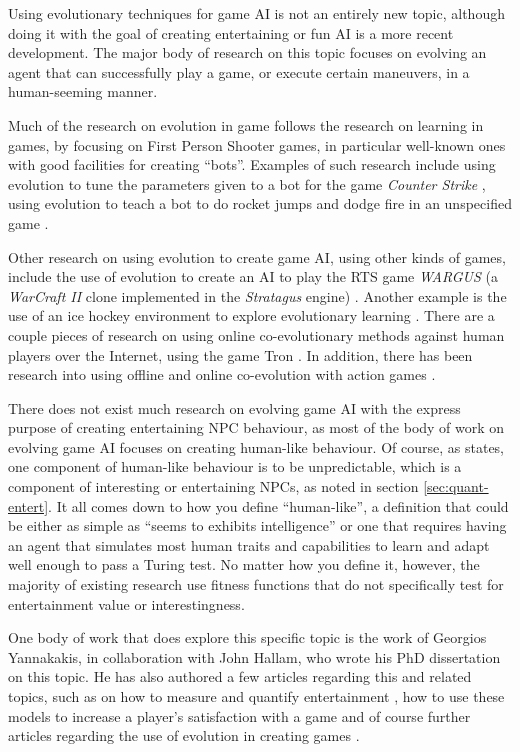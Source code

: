 \documentclass[]{report}
\begin{document}
Using evolutionary techniques for game AI is not an entirely new topic, although
doing it with the goal of creating entertaining or fun AI is a more recent
development. The major body of research on this topic focuses on evolving an
agent that can successfully play a game, or execute certain maneuvers, in a
human-seeming manner.

Much of the research on evolution in game follows the research on learning in
games, by focusing on First Person Shooter games, in particular well-known ones
with good facilities for creating ``bots''. Examples of such research include
using evolution to tune the parameters given to a bot for the game \emph{Counter
  Strike} \citep{cole2004using}, using evolution to teach a bot to do rocket
jumps and dodge fire in an unspecified game \citep{champandard2003ai}.

Other research on using evolution to create game AI, using other kinds of games,
include the use of evolution to create an AI to play the RTS game \emph{WARGUS}
(a \emph{WarCraft II} clone implemented in the \emph{Stratagus} engine)
\citep{spronck2004difficulty}. Another example is the use of an ice hockey
environment to explore evolutionary learning \citep{blair1999exploring}. There
are a couple pieces of research on using online co-evolutionary methods against
human players over the Internet, using the game Tron
\citep{funes2000measuring,funes1998animal}. In addition, there has been research
into using offline and online co-evolution with action games
\citep{demasi2003online}.

There does not exist much research on evolving game AI with the express purpose
of creating entertaining NPC behaviour, as most of the body of work on evolving
game AI focuses on creating human-like behaviour. Of course, as
\citet{bauckhage2003learning} states, one component of human-like behaviour is
to be unpredictable, which is a component of interesting or entertaining NPCs,
as noted in section \ref{sec:quant-entert}. It all comes down to how you define
``human-like'', a definition that could be either as simple as ``seems to
exhibits intelligence'' or one that requires having an agent that simulates most
human traits and capabilities to learn and adapt well enough to pass a Turing
test. No matter how you define it, however, the majority of existing research
use fitness functions that do not specifically test for entertainment value or
interestingness.

One body of work that does explore this specific topic is the work of Georgios
Yannakakis, in collaboration with John Hallam, who wrote his PhD dissertation
\citep{yannakakis2005ai} on this topic. He has also authored a few articles
regarding this and related topics, such as on how to measure and quantify
entertainment
\citep{yannakakis2007modeling,yannakakis2008model,yannakakis2008entertainment},
how to use these models to increase a player's satisfaction with a game
\citep{yannakakis2009real,yannakakis2008model} and of course further articles
regarding the use of evolution in creating games
\citep{yannakakis2004evolving,yannakakis2004interactive}.
\end{document}
